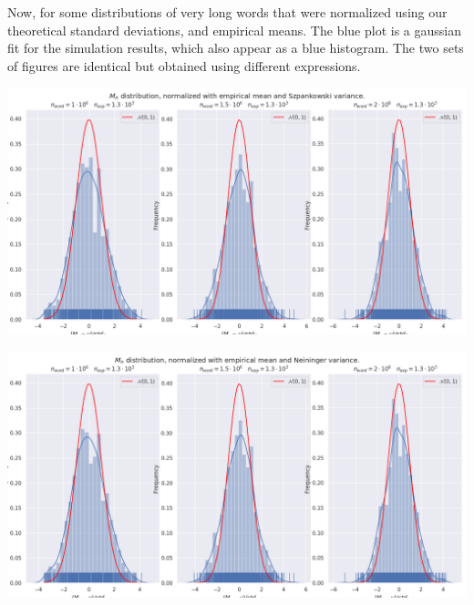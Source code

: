 
\pagebreak
Now, for some distributions of very long words that were normalized using 
our theoretical standard deviations, and empirical means. The blue plot is 
a gaussian fit for the simulation results, which also appear as a blue histogram.
The two sets of figures are identical but obtained using different expressions.

\noindent
 	 \begin{minipage}{\textwidth}
        \includegraphics[width = \textwidth,
        				    trim = 0 0.5cm 0 0,
        				    	clip=true]{./figs/eig_fig2.png}	
	\end{minipage} 

\noindent
 	 \begin{minipage}{\textwidth}
        \includegraphics[width = \textwidth,
        				    trim = 0 0.5cm 0 0,
        				    	clip=true]{./figs/eig_fig3.png}	
	\end{minipage} 


